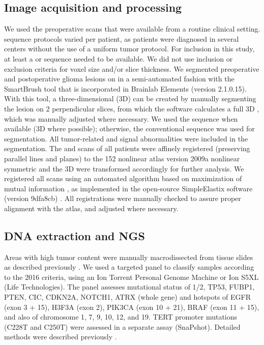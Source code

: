 \subsection{Image acquisition and processing}
We used the preoperative  scans that were available from a routine clinical setting.
 sequence protocols varied per patient, as patients were diagnosed in several centers without the use of a uniform \gls{tumor}  protocol.
For inclusion in this study, at least a  or  sequence needed to be available.
We did not use inclusion or exclusion criteria for voxel size and/or slice thickness.
We segmented preoperative and postoperative glioma lesions on  in a semi-automated fashion with the SmartBrush tool that is incorporated in Brainlab Elements (version 2.1.0.15).
With this tool, a three-dimensional (3D)  can be created by manually segmenting the lesion on 2 perpendicular slices, from which the software calculates a full 3D , which was manually adjusted where necessary.
We used the  sequence when available (3D where possible); otherwise, the conventional  sequence was used for segmentation.
All \gls{tumor}-related  and  signal abnormalities were included in the segmentation.
The  and  scans of all patients were affinely registered (preserving parallel lines and planes) to the   152 nonlinear  atlas version 2009a nonlinear symmetric \autocite{fonov2011unbiased, fonov2009unbiased} and the 3D  were transformed accordingly for further analysis.
We registered all  scans using an automated algorithm based on maximization of mutual information \autocite{klein2009adaptive}, as implemented in the open-source SimpleElastix software (version 9dfa8cb) \autocite{marstal2016simpleelastix}.
All registrations were manually checked to assure proper alignment with the atlas, and adjusted where necessary.

\subsection{DNA extraction and \acrlong{NGS}}

Areas with high \gls{tumor} content were manually macrodissected from  tissue slides as described previously \autocite{wijnenga2017impact}.
We used a targeted  panel to classify samples according to the  2016 criteria, using an Ion Torrent Personal Genome Machine or Ion S5XL (Life Technologies).
The panel assesses mutational status of 1/2, TP53, FUBP1, PTEN, CIC, CDKN2A, NOTCH1, ATRX (whole gene) and hotspots of EGFR (exon 3 + 15), H3F3A (exon 2), PIK3CA (exon 10 + 21), BRAF (exon 11 + 15), and also  of chromosome 1, 7, 9, 10, 12, and 19.
TERT promoter mutations (C228T and C250T) were assessed in a separate assay (SnaPshot).
Detailed methods were described previously \autocite{wijnenga2017impact, wijnenga2018prognostic}.

